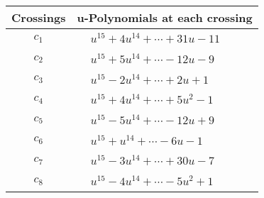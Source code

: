 \documentclass[1p]{elsarticle_modified}
\theoremstyle{definition}
\begin{document}
\begin{tabular}{m{50pt}|m{274pt}}
Crossings & \hspace{64pt}u-Polynomials at each crossing \\
\hline $$\begin{aligned}c_{1}\end{aligned}$$&$\begin{aligned}
&u^{15}+4 u^{14}+\cdots+31 u-11
\end{aligned}$\\
\hline $$\begin{aligned}c_{2}\end{aligned}$$&$\begin{aligned}
&u^{15}+5 u^{14}+\cdots-12 u-9
\end{aligned}$\\
\hline $$\begin{aligned}c_{3}\end{aligned}$$&$\begin{aligned}
&u^{15}-2 u^{14}+\cdots+2 u+1
\end{aligned}$\\
\hline $$\begin{aligned}c_{4}\end{aligned}$$&$\begin{aligned}
&u^{15}+4 u^{14}+\cdots+5 u^2-1
\end{aligned}$\\
\hline $$\begin{aligned}c_{5}\end{aligned}$$&$\begin{aligned}
&u^{15}-5 u^{14}+\cdots-12 u+9
\end{aligned}$\\
\hline $$\begin{aligned}c_{6}\end{aligned}$$&$\begin{aligned}
&u^{15}+u^{14}+\cdots-6 u-1
\end{aligned}$\\
\hline $$\begin{aligned}c_{7}\end{aligned}$$&$\begin{aligned}
&u^{15}-3 u^{14}+\cdots+30 u-7
\end{aligned}$\\
\hline $$\begin{aligned}c_{8}\end{aligned}$$&$\begin{aligned}
&u^{15}-4 u^{14}+\cdots-5 u^2+1
\end{aligned}$\\

\end{tabular}
\end{document}
